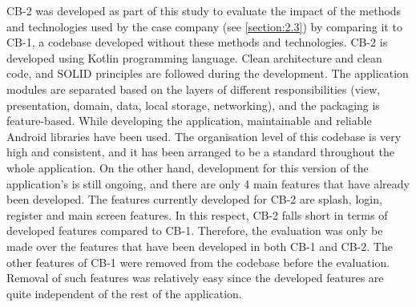 CB-2 was developed as part of this study to evaluate the impact of the methods and technologies used by the case company (see \ref{section:2.3}) by comparing it to CB-1, a codebase developed without these methods and technologies. CB-2 is developed using Kotlin programming language. Clean architecture and clean code, and SOLID principles are followed during the development. The application modules are separated based on the layers of different responsibilities (view, presentation, domain, data, local storage, networking), and the packaging is feature-based. While developing the application, maintainable and reliable Android libraries have been used. The organisation level of this codebase is very high and consistent, and it has been arranged to be a standard throughout the whole application. On the other hand,  development for this version of the application's is still ongoing, and there are only 4 main features that have already been developed. The features currently developed for CB-2 are splash, login, register and main screen features. In this respect, CB-2 falls short in terms of developed features compared to CB-1. Therefore, the evaluation was only be made over the features that have been developed in both CB-1 and CB-2. The other features of CB-1 were removed from the codebase before the evaluation. Removal of such features was relatively easy since the developed features are quite independent of the rest of the application.


